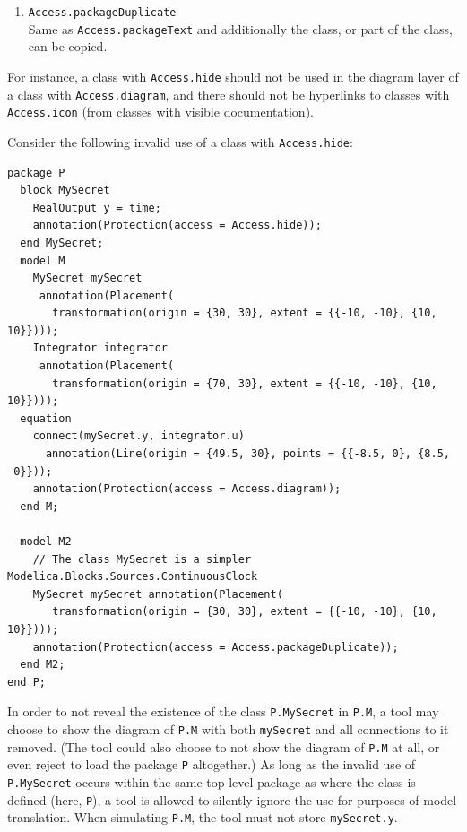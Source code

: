 \begin{annotationdefinition*}[access]
\begin{semantics}
\begin{enumerate}
  \lstinline!Access.packageText!\\
  Same as \lstinline!Access.diagram! (note: \emph{not} including all rights of \lstinline!Access.nonPackageDuplicate!) and additionally the whole class definition can be accessed (but that text cannot be copied, i.e., you can see but not copy the source code).
\item
  \lstinline!Access.packageDuplicate!\\
  Same as \lstinline!Access.packageText! and additionally the class, or part of the class, can be copied.
\end{enumerate}
\end{semantics}
\end{annotationdefinition*}

\begin{example}
For instance, a class with \lstinline!Access.hide! should not be used in the diagram layer of a class with \lstinline!Access.diagram!, and there should not be hyperlinks to classes with \lstinline!Access.icon! (from classes with visible documentation).

Consider the following invalid use of a class with \lstinline!Access.hide!:
\begin{lstlisting}[language=modelica]
package P
  block MySecret
    RealOutput y = time;
    annotation(Protection(access = Access.hide));
  end MySecret;
  model M
    MySecret mySecret
     annotation(Placement(
       transformation(origin = {30, 30}, extent = {{-10, -10}, {10, 10}})));
    Integrator integrator
     annotation(Placement(
       transformation(origin = {70, 30}, extent = {{-10, -10}, {10, 10}})));
  equation
    connect(mySecret.y, integrator.u)
      annotation(Line(origin = {49.5, 30}, points = {{-8.5, 0}, {8.5, -0}}));
    annotation(Protection(access = Access.diagram));
  end M;

  model M2
    // The class MySecret is a simpler Modelica.Blocks.Sources.ContinuousClock
    MySecret mySecret annotation(Placement(
       transformation(origin = {30, 30}, extent = {{-10, -10}, {10, 10}})));
    annotation(Protection(access = Access.packageDuplicate));
  end M2;
end P;
\end{lstlisting}
In order to not reveal the existence of the class \lstinline!P.MySecret! in \lstinline!P.M!, a tool may choose to show the diagram of \lstinline!P.M! with both \lstinline!mySecret! and all connections to it removed.
(The tool could also choose to not show the diagram of \lstinline!P.M! at all, or even reject to load the package \lstinline!P! altogether.)
As long as the invalid use of \lstinline!P.MySecret! occurs within the same top level package as where the class is defined (here, \lstinline!P!), a tool is allowed to silently ignore the use for purposes of model translation.
When simulating \lstinline!P.M!, the tool must not store \lstinline!mySecret.y!.


\end{example}
